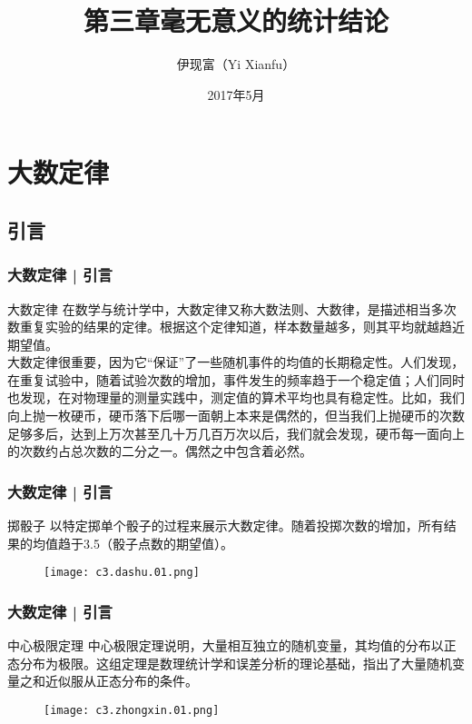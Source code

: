 



\title[无意义的统计]{第三章\quad 毫无意义的统计结论}
\author[Yixf]{伊现富（Yi Xianfu）}
\date{2017年5月}



\section{大数定律}
\subsection{引言}
\begin{frame}
  \frametitle{大数定律 | 引言}
  \begin{block}{大数定律}
    在数学与统计学中，大数定律又称大数法则、大数律，是描述相当多次数重复实验的结果的定律。根据这个定律知道，样本数量越多，则其平均就越趋近期望值。\\
    \vspace{1em}
大数定律很重要，因为它“保证”了一些随机事件的均值的长期稳定性。人们发现，在重复试验中，随着试验次数的增加，事件发生的频率趋于一个稳定值；人们同时也发现，在对物理量的测量实践中，测定值的算术平均也具有稳定性。比如，我们向上抛一枚硬币，硬币落下后哪一面朝上本来是偶然的，但当我们上抛硬币的次数足够多后，达到上万次甚至几十万几百万次以后，我们就会发现，硬币每一面向上的次数约占总次数的二分之一。偶然之中包含着必然。
  \end{block}
\end{frame}

\begin{frame}
  \frametitle{大数定律 | 引言}
  \begin{block}{掷骰子}
    以特定掷单个骰子的过程来展示大数定律。随着投掷次数的增加，所有结果的均值趋于3.5（骰子点数的期望值）。
    \vspace{-1.2em}
    \begin{figure}
      \centering
      \texttt{[image: c3.dashu.01.png]}
    \end{figure}
  \end{block}
\end{frame}

\begin{frame}
  \frametitle{大数定律 | 引言}
  \begin{block}{中心极限定理}
  中心极限定理说明，大量相互独立的随机变量，其均值的分布以正态分布为极限。这组定理是数理统计学和误差分析的理论基础，指出了大量随机变量之和近似服从正态分布的条件。
  \vspace{-1em}
  \begin{figure}
    \centering
    \texttt{[image: c3.zhongxin.01.png]}
  \end{figure}
  \end{block}
\end{frame}

